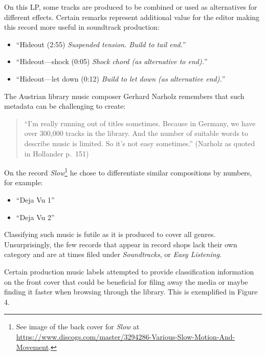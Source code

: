 \documentclass[a4paper,
fontsize=11pt,
oneside,
numbers=noperiodatend,
parskip=half-,
bibliography=totoc,
final
]{scrartcl}
\begin{document}
On this LP, some tracks are produced to be combined or used as
alternatives for different effects. Certain remarks represent additional
value for the editor making this record more useful in soundtrack
production:

\begin{itemize}

\item
  \enquote{Hideout (2:55) \emph{Suspended tension. Build to tail end.}}
\item
  \enquote{Hideout---shock (0:05) \emph{Shock chord (as alternative to
  end).}}
\item
  \enquote{Hideout---let down (0:12) \emph{Build to let down (as
  alternative end).}}
\end{itemize}

The Austrian library music composer Gerhard Narholz remembers that such
metadata can be challenging to create:

\begin{quote}
\enquote{I'm really running out of titles sometimes. Because in Germany,
we have over 300,000 tracks in the library. And the number of suitable
words to describe music is limited. So it's not easy sometimes.}
(Narholz as quoted in Hollander p.~151)
\end{quote}

On the record \emph{Slow}\footnote{See image of the back cover for
  \emph{Slow} at
  \url{https://www.discogs.com/master/3294286-Various-Slow-Motion-And-Movement}.}
he chose to differentiate similar compositions by numbers, for example:

\begin{itemize}
\item
  \enquote{Deja Vu 1}
\item
  \enquote{Deja Vu 2}
\end{itemize}

Classifying such music is futile as it is produced to cover all genres.
Unsurprisingly, the few records that appear in record shops lack their
own category and are at times filed under \emph{Soundtracks}, or
\emph{Easy Listening}.

Certain production music labels attempted to provide classification
information on the front cover that could be beneficial for filing away
the media or maybe finding it faster when browsing through the library.
This is exemplified in Figure 4.
\end{document}
